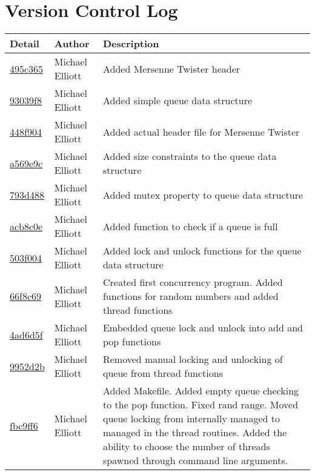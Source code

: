 \documentclass[letterpaper,10pt,titlepage,draftclsnofoot,onecolumn]{IEEEtran}
\begin{document}
\section{Version Control Log}
\begin{tabular}{l l l}\textbf{Detail} & \textbf{Author} & \textbf{Description}\\\hline
\href{https://github.com/elliomic/CS-444/commit/495c3654bd7736ea43c6a88eb59743eab5e64695}{495c365} & Michael Elliott & Added Mersenne Twister header\\\hline
\href{https://github.com/elliomic/CS-444/commit/93039f88419ac754dcbd9f5e86c4acc2ae075c92}{93039f8} & Michael Elliott & Added simple queue data structure\\\hline
\href{https://github.com/elliomic/CS-444/commit/448f904d4299eed4f7290557a7dd2ed03a731583}{448f904} & Michael Elliott & Added actual header file for Mersenne Twister\\\hline
\href{https://github.com/elliomic/CS-444/commit/a569e9c76e5f3b7d77a61959641102f75df9826e}{a569e9c} & Michael Elliott & Added size constraints to the queue data structure\\\hline
\href{https://github.com/elliomic/CS-444/commit/793d488cb52123a48e8d345293ce4359e2c301c1}{793d488} & Michael Elliott & Added mutex property to queue data structure\\\hline
\href{https://github.com/elliomic/CS-444/commit/acb8c0e69e610e33efc6d0764caa3ccc66a663d9}{acb8c0e} & Michael Elliott & Added function to check if a queue is full\\\hline
\href{https://github.com/elliomic/CS-444/commit/503f004502547d608cf63b7cd5b60aad8b3ab3f7}{503f004} & Michael Elliott & Added lock and unlock functions for the queue data structure\\\hline
\href{https://github.com/elliomic/CS-444/commit/66f8c69f4b2b4122718aad4f72a9eeadd9e06545}{66f8c69} & Michael Elliott & Created first concurrency program. Added functions for random numbers and added thread functions\\\hline
\href{https://github.com/elliomic/CS-444/commit/4ad6d5f2f7a954616d7a38cb8cecd9c26fc3c5f3}{4ad6d5f} & Michael Elliott & Embedded queue lock and unlock into add and pop functions\\\hline
\href{https://github.com/elliomic/CS-444/commit/9952d2b8061cbde3abc5e0b6fb4430c04aaa28e7}{9952d2b} & Michael Elliott & Removed manual locking and unlocking of queue from thread functions\\\hline
\href{https://github.com/elliomic/CS-444/commit/fbc9ff6fcc38d42815a70a9a0efff13171a768ac}{fbc9ff6} & Michael Elliott & Added Makefile. Added empty queue checking to the pop function. Fixed rand range. Moved queue locking from internally managed to managed in the thread routines. Added the ability to choose the number of threads spawned through command line arguments.\\\hline

\end{tabular}
\end{document}
